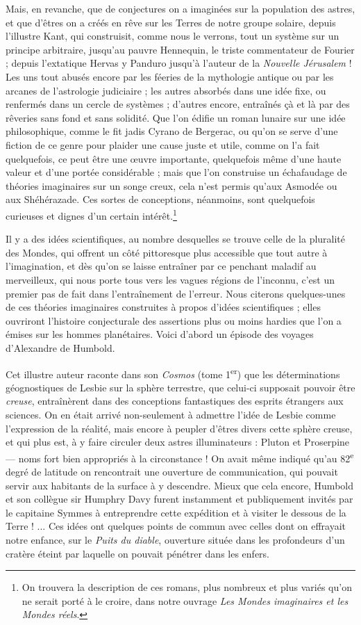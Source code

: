 \documentclass[a4paper, 11pt, oneside, landscape]{article}
\begin{document}
Mais, en revanche, que de conjectures on a imaginées sur la population des astres, et que d'êtres on a créés en rêve sur les Terres de notre groupe solaire, depuis l'illustre Kant, qui construisit, comme nous le verrons, tout un système sur un principe arbitraire, jusqu'au pauvre Hennequin, le triste commentateur de Fourier ; depuis l'extatique Hervas y Panduro jusqu'à l'auteur de la \emph{Nouvelle Jérusalem} ! Les uns tout abusés encore par les féeries de la mythologie antique ou par les arcanes de l'astrologie judiciaire ; les autres absorbés dans une idée fixe, ou renfermés dans un cercle de systèmes ; d'autres encore, entraînés çà et là par des rêveries sans fond et sans solidité. Que l'on édifie un roman lunaire sur une idée philosophique, comme le fit jadis Cyrano de Bergerac, ou qu'on se serve d'une fiction de ce genre pour plaider une cause juste et utile, comme on l'a fait quelquefois, ce peut être une œuvre importante, quelquefois même d'une haute valeur et d'une portée considérable ; mais que l'on construise un échafaudage de théories imaginaires sur un songe creux, cela n'est permis qu'aux Asmodée ou aux Shéhérazade. Ces sortes de conceptions, néanmoins, sont quelquefois curieuses et dignes d'un certain intérêt.\footnote{On trouvera la description de ces romans, plus nombreux et plus variés qu'on ne serait porté à le croire, dans notre ouvrage \emph{Les Mondes imaginaires et les Mondes réels}.}

Il y a des idées scientifiques, au nombre desquelles se trouve celle de la pluralité des Mondes, qui offrent un côté pittoresque plus accessible que tout autre à l'imagination, et dès qu'on se laisse entraîner par ce penchant maladif au merveilleux, qui nous porte tous vers les vagues régions de l'inconnu, c'est un premier pas de fait dans l'entraînement de l'erreur. Nous citerons quelques-unes de ces théories imaginaires construites à propos d'idées scientifiques ; elles ouvriront l'histoire conjecturale des assertions plus ou moins hardies que l'on a émises sur les hommes planétaires. Voici d'abord un épisode des voyages d'Alexandre de Humbold.

Cet illustre auteur raconte dans son \emph{Cosmos} (tome 1\textsuperscript{er}) que les déterminations géognostiques de Lesbie sur la sphère terrestre, que celui-ci supposait pouvoir être \emph{creuse}, entraînèrent dans des conceptions fantastiques des esprits étrangers aux sciences. On en était arrivé non-seulement à admettre l'idée de Lesbie comme l'expression de la réalité, mais encore à peupler d'êtres divers cette sphère creuse, et qui plus est, à y faire circuler deux astres illuminateurs : Pluton et Proserpine --- noms fort bien appropriés à la circonstance ! On avait même indiqué qu'au 82\textsuperscript{e} degré de latitude on rencontrait une ouverture de communication, qui pouvait servir aux habitants de la surface à y descendre. Mieux que cela encore, Humbold et son collègue sir Humphry Davy furent instamment et publiquement invités par le capitaine Symmes à entreprendre cette expédition et à visiter le dessous de la Terre ! ... Ces idées ont quelques points de commun avec celles dont on effrayait notre enfance, sur le \emph{Puits du diable}, ouverture située dans les profondeurs d'un cratère éteint par laquelle on pouvait pénétrer dans les enfers.
\end{document}
